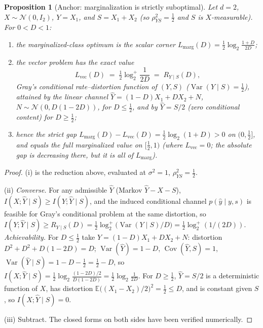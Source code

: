 ﻿\documentclass[11pt,onecolumn]{IEEEtran}
\newtheorem{proposition}[theorem]{Proposition}
\newcommand{\E}{\mathbb{E}}
\newcommand{\Cov}{\operatorname{Cov}}
\newcommand{\hY}{\widehat{Y}}
\begin{document}
\begin{proposition}[Anchor: marginalization is strictly
suboptimal]\label{prop:marg}
Let $d=2$, $X\sim\mathcal N(0,I_2)$, $Y=X_1$, and $S=X_1+X_2$ (so
$\rho_{YS}^2=\tfrac12$ and $S$ is $X$-measurable). For $0<D<1$:
\begin{enumerate}
\item[(i)] the marginalized-class optimum is the scalar corner
$L_{\mathrm{marg}}(D)=\tfrac12\log_2\!\frac{1+D}{2D}$;
\item[(ii)] the vector problem has the exact value
\[
L_{\mathrm{vec}}(D)\;=\;\tfrac12\log_2^{+}\!\frac{1}{2D}
\;=\;R_{Y\mid S}(D),
\]
Gray's conditional rate--distortion function of $(Y,S)$ \cite{gray1973}
($\operatorname{Var}(Y\mid S)=\tfrac12$), attained by the linear channel
$\hY=(1-D)X_1+DX_2+N$, $N\sim\mathcal N(0,D(1-2D))$, for $D\le\tfrac12$,
and by $\hY=S/2$ (zero conditional content) for $D\ge\tfrac12$;
\item[(iii)] hence the strict gap
$L_{\mathrm{marg}}(D)-L_{\mathrm{vec}}(D)=\tfrac12\log_2(1+D)>0$ on
$(0,\tfrac12]$, and equals the full marginalized value on
$[\tfrac12,1)$ (where $L_{\mathrm{vec}}=0$; the absolute gap is decreasing
there, but it is all of $L_{\mathrm{marg}}$).
\end{enumerate}
\end{proposition}

\begin{proof}
(i) is the reduction above, evaluated at $\sigma^2=1$,
$\rho_{YS}^2=\tfrac12$.

(ii) \emph{Converse.} For any admissible $\hY$ (Markov $\hY-X-S$),
$I(X;\hY\mid S)\ge I(Y;\hY\mid S)$, and the induced conditional channel
$p(\hat y\mid y,s)$ is feasible for Gray's conditional problem at the same
distortion, so $I(Y;\hY\mid S)\ge R_{Y\mid S}(D)=\tfrac12\log_2^{+}
\bigl(\operatorname{Var}(Y\mid S)/D\bigr)=\tfrac12\log_2^{+}(1/(2D))$.
\emph{Achievability.} For $D\le\tfrac12$ take
$\hY=(1-D)X_1+DX_2+N$: distortion $D^2+D^2+D(1-2D)=D$;
$\operatorname{Var}(\hY)=1-D$, $\Cov(\hY,S)=1$,
$\operatorname{Var}(\hY\mid S)=1-D-\tfrac12=\tfrac12-D$, so
$I(X;\hY\mid S)=\tfrac12\log_2\frac{(1-2D)/2}{D(1-2D)}
=\tfrac12\log_2\frac1{2D}$. For $D\ge\tfrac12$, $\hY=S/2$ is a
deterministic function of $X$, has distortion
$\E\bigl((X_1-X_2)/2\bigr)^2=\tfrac12\le D$, and is constant given $S$, so
$I(X;\hY\mid S)=0$.

(iii) Subtract. The closed forms on both sides have been verified
numerically.
\end{proof}
\end{document}
